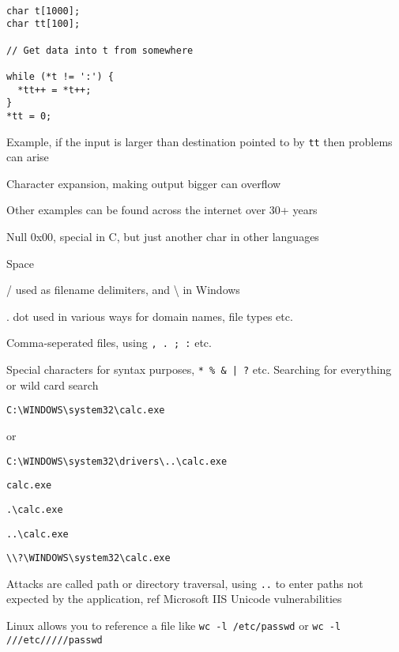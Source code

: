 \documentclass[Screen16to9,17pt]{foils}
\begin{document}


\begin{verbatim}

char t[1000];
char tt[100];

// Get data into t from somewhere

while (*t != ':') {
  *tt++ = *t++;
}
*tt = 0;
\end{verbatim}

\begin{list2}
\item Example, if the input is larger than destination pointed to by \verb+tt+ then problems can arise
\item Character expansion, making output bigger can overflow
\item Other examples can be found across the internet over 30+ years
\end{list2}


\begin{list2}
\item Null 0x00, special in C, but just another char in other languages
\item Space
\item / used as filename delimiters, and \textbackslash{} in Windows
\item . dot used in various ways for domain names, file types etc.
\item Comma-seperated files, using \verb+, . ; :+ etc.
\item Special characters for syntax purposes, \verb+* % & | ?+ etc. Searching for everything or wild card search
\end{list2}




\verb+C:\WINDOWS\system32\calc.exe+

or
\begin{list2}
\item \verb+C:\WINDOWS\system32\drivers\..\calc.exe+
\item \verb+calc.exe+
\item \verb+.\calc.exe+
\item \verb+..\calc.exe+
\item \verb+\\?\WINDOWS\system32\calc.exe+
\item Attacks are called path or directory traversal, using \verb+..+ to enter paths not expected by the application, ref Microsoft IIS Unicode vulnerabilities

\item Linux allows you to reference a file like \verb+wc -l /etc/passwd+ or \verb+wc -l ///etc/////passwd+
\end{list2}
\end{document}
